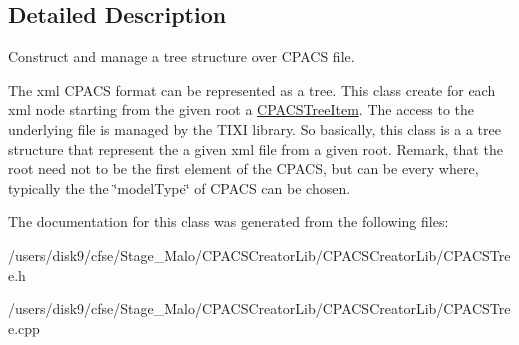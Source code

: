 \subsection{Detailed Description}
Construct and manage a tree structure over C\-P\-A\-C\-S file. 

The xml C\-P\-A\-C\-S format can be represented as a tree. This class create for each xml node starting from the given root a \hyperlink{classcpcr_1_1CPACSTreeItem}{C\-P\-A\-C\-S\-Tree\-Item}. The access to the underlying file is managed by the T\-I\-X\-I library. So basically, this class is a a tree structure that represent the a given xml file from a given root. Remark, that the root need not to be the first element of the C\-P\-A\-C\-S, but can be every where, typically the the \char`\"{}model\-Type\char`\"{} of C\-P\-A\-C\-S can be chosen. 

The documentation for this class was generated from the following files\-:\begin{DoxyCompactItemize}
\item 
/users/disk9/cfse/\-Stage\-\_\-\-Malo/\-C\-P\-A\-C\-S\-Creator\-Lib/\-C\-P\-A\-C\-S\-Creator\-Lib/C\-P\-A\-C\-S\-Tree.\-h\item 
/users/disk9/cfse/\-Stage\-\_\-\-Malo/\-C\-P\-A\-C\-S\-Creator\-Lib/\-C\-P\-A\-C\-S\-Creator\-Lib/C\-P\-A\-C\-S\-Tree.\-cpp\end{DoxyCompactItemize}
